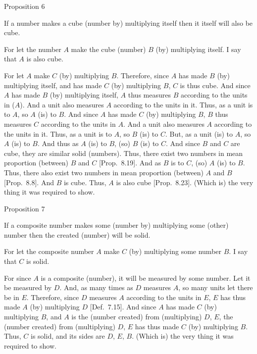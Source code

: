 
\begin{center}
{\large Proposition 6}
\end{center}

If a number makes a cube (number by) multiplying itself then it itself will also be  cube.

\epsfysize=0.8in
\centerline{}

For let the number $A$ make the cube (number) $B$ (by) multiplying itself.
I say that $A$ is also cube.

For let $A$ make $C$ (by) multiplying $B$. Therefore, since $A$
has made $B$ (by) multiplying itself, and has made $C$ (by) multiplying 
$B$, $C$ is thus cube. And since $A$ has made $B$ (by)
multiplying itself, $A$ thus measures $B$ according to the units in ($A$).
And a unit also measures $A$ according to the units in it. Thus, as
a unit is to $A$, so $A$ (is) to $B$. And since $A$ has made $C$ (by)
multiplying $B$, $B$ thus measures $C$ according to the units in $A$.
And a unit also measures $A$ according to the units in it. Thus, as
a unit is to $A$, so $B$ (is) to $C$. But, as a unit (is) to $A$, so $A$ (is)
to $B$. And thus as $A$ (is) to $B$, (so) $B$ (is) to $C$. And since $B$
and $C$ are cube, they are similar solid (numbers). Thus,
there exist two numbers in mean proportion (between) $B$ and $C$ [Prop.~8.19]. And as $B$ is to $C$, (so) $A$ (is)
to $B$. Thus, there also exist two numbers in mean proportion (between) $A$ and
$B$ [Prop.~8.8].  And $B$ is  cube. Thus, $A$
is also  cube   [Prop.~8.23]. (Which is)
the very thing it was required to show.


\begin{center}
{\large Proposition 7}
\end{center}

If a composite number makes some (number by)
multiplying some (other) number then the created (number) will be  solid.

\epsfysize=1.5in
\centerline{}

For let the composite number $A$ make $C$ (by) multiplying some number
$B$. I say that $C$ is  solid.

For since $A$ is a composite (number), it will be measured by some
number. Let it be measured by $D$.  And, as many times as $D$ measures
$A$, so many units let there be in $E$. Therefore, since $D$ measures $A$
according to the units in $E$, $E$ has thus made $A$ (by) multiplying
$D$ [Def.~7.15]. And since $A$ has made $C$ (by) multiplying $B$, and $A$ is
the (number created) from (multiplying) $D$, $E$, the (number created)
from (multiplying) $D$, $E$ has thus made $C$ (by) multiplying $B$. Thus,
$C$ is solid, and its sides are $D$, $E$, $B$. (Which is) the
very thing it was required to show.

